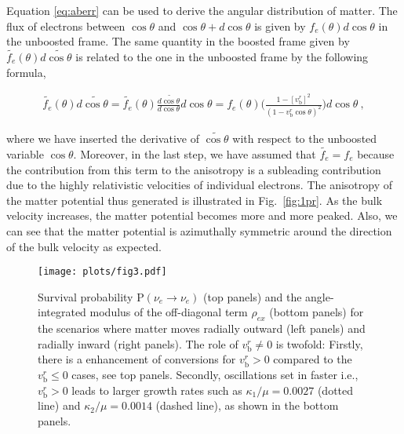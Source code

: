 \documentclass[aps, prd, 10pt, twocolumn, superscriptaddress, noshowpacs, preprintnumbers, longbibliography, groupedaddress, footinbib, bibnotes]{revtex4-1}
\newcommand{\vbr}{v_{\mathrm{b}}^{r}}
\begin{document}
Equation \ref{eq:aberr} can be used to derive the angular distribution of matter. The flux of electrons between $\cos\theta$ and $\cos\theta + d \cos\theta$ is given by $f_{e}(\theta) d\cos\theta$ in the unboosted frame. The same quantity in the boosted frame given by $\widetilde{f_{e}}(\theta) d\widetilde{\cos{\theta}}$ is related to the one in the unboosted frame by the following formula,
\begin{widetext}
\begin{eqnarray}
\label{eq:ne_aniso}
\widetilde{f_{e}}(\theta) d\widetilde{\cos{\theta}} = \widetilde{f_{e}}(\theta) \frac{d\widetilde{\cos{\theta}}}{d\cos{\theta}} d\cos{\theta} =f_{e}(\theta) \Bigg( \frac{1-[\vbr]^2}{(1-\vbr\cos{\theta})^2} \Bigg) d\cos{\theta}\ ,
\end{eqnarray}
\end{widetext}
where we have inserted the derivative of $\widetilde{\cos{\theta}}$ with respect to the unboosted variable $\cos{\theta}$. Moreover, in the last step, we have assumed that $ \widetilde{f_{e}} = f_{e} $ because the contribution from this term to the anisotropy is a subleading contribution due to the highly relativistic velocities of individual electrons. The anisotropy of the matter potential thus generated is illustrated in Fig.~\ref{fig:1pr}. As the bulk velocity increases, the matter potential becomes more and more peaked. Also, we can see that the matter potential is azimuthally symmetric around the direction of the bulk velocity as expected. 

\begin{figure*}[t!]
\centering
\texttt{[image: plots/fig3.pdf]}
\caption{Survival probability $\mathrm{P}(\nu_e \rightarrow \nu_e)$ (top panels) and the angle-integrated modulus of the off-diagonal term $\rho_{ex}$ (bottom panels) for the scenarios where matter moves radially outward (left panels) and radially inward (right panels). The role of $\vbr \neq 0$ is twofold: Firstly, there is a enhancement of conversions for $\vbr>0$ compared to the $\vbr \leq 0$ cases, see top panels. Secondly, oscillations set in faster i.e., $\vbr > 0$ leads to larger growth rates such as $\kappa_1/\mu=0.0027$ (dotted line) and $\kappa_2/\mu=0.0014$ (dashed line), as shown in the bottom panels.
}
\label{fig:3pr}
\end{figure*}




\end{document}
